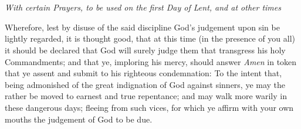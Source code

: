 \chapter[A Commination]{}
{\centering\footnotesize\emph{With certain Prayers, to be used on the first Day of Lent, and at other times}\par}



\medskip
{}


Wherefore, lest by disuse of the said discipline God’s judgement upon sin be lightly regarded, it is thought good, that at this time (in the presence of you all) it should be declared that God will surely judge them that transgress his holy Commandments; and that ye, imploring his mercy, should answer \emph{Amen} in token that ye assent and submit to his righteous condemnation: To the intent that, being admonished of the great indignation of God against sinners, ye may the rather be moved to earnest and true repentance; and may walk more warily in these dangerous days; fleeing from such vices, for which ye affirm with your own mouths the judgement of God to be due.







